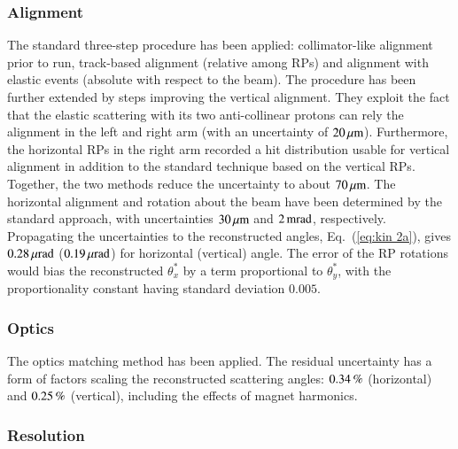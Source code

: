 
\subsubsection{Alignment}

The standard three-step procedure \cite{totem-ijmp} has been applied: collimator-like alignment prior to run, track-based alignment (relative among RPs) and alignment with elastic events (absolute with respect to the beam). The procedure has been further extended by steps improving the vertical alignment. They exploit the fact that the elastic scattering with its two anti-collinear protons can rely the alignment in the left and right arm (with an uncertainty of $20\,{\rm \mu m}$). Furthermore, the horizontal RPs in the right arm recorded a hit distribution usable for vertical alignment in addition to the standard technique based on the vertical RPs. Together, the two methods reduce the uncertainty to about $70\,{\rm \mu m}$. The horizontal alignment and rotation about the beam have been determined by the standard approach, with uncertainties $30\,{\rm \mu m}$ and $2\,{\rm m rad}$, respectively. Propagating the uncertainties to the reconstructed angles, Eq.~(\ref{eq:kin 2a}), gives $0.28\,{\rm \mu rad}$ ($0.19\,{\rm \mu rad}$) for horizontal (vertical) angle. The error of the RP rotations would bias the reconstructed $\theta_x^*$ by a term proportional to $\theta_y^*$, with the proportionality constant having standard deviation $0.005$.



\subsubsection{Optics}

The optics matching method \cite{totem-optics} has been applied. The residual uncertainty has a form of factors scaling the reconstructed scattering angles:
$0.34\,{\rm \%}$ (horizontal) and $0.25\,{\rm \%}$ (vertical), including the effects of magnet harmonics.



\subsubsection{Resolution}

